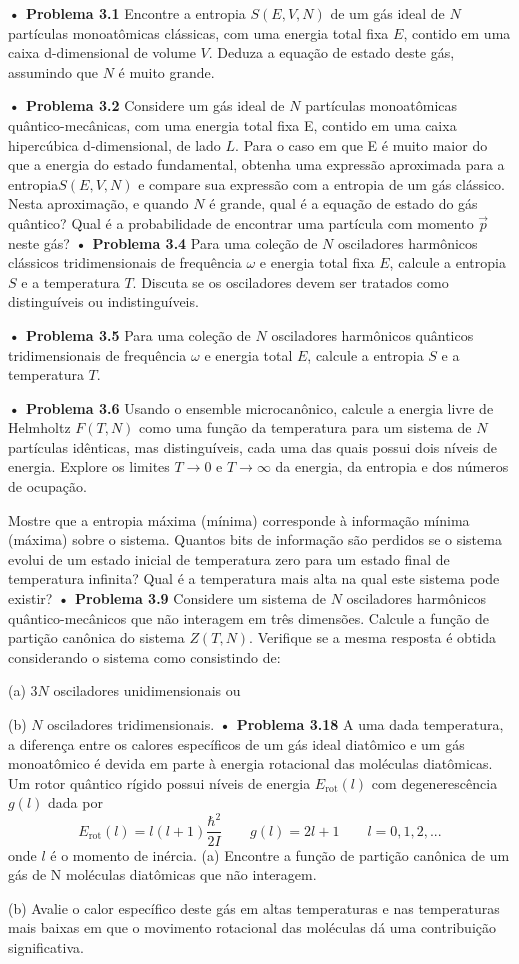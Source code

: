 \documentclass[12pt]{article}
\begin{document}
\textbf{• Problema 3.1} Encontre a entropia $S(E, V, N)$ de um gás ideal de $N$ partículas monoatômicas clássicas, com uma energia total fixa $E$, contido em uma caixa d-dimensional de volume $V$. Deduza a equação de estado deste gás, assumindo que $N$ é muito grande.

\textbf{• Problema 3.2} Considere um gás ideal de $N$ partículas monoatômicas quântico-mecânicas, com uma energia total fixa E, contido em uma caixa hipercúbica d-dimensional, de lado $L$. Para o caso em que E é muito maior do que a energia do estado fundamental, obtenha uma expressão aproximada para a entropia$ S(E, V, N)$ e compare sua expressão com a entropia de um gás clássico. Nesta aproximação, e quando $N$ é grande, qual é a equação de estado do gás quântico? Qual é a probabilidade de encontrar uma partícula com momento $\vec{p}$ neste gás?
\textbf{• Problema 3.4} Para uma coleção de $N$ osciladores harmônicos clássicos tridimensionais de frequência $\omega$ e energia total fixa $E$, calcule a entropia $S$ e a temperatura $T$. Discuta se os osciladores devem ser tratados como distinguíveis ou indistinguíveis.

\textbf{• Problema 3.5} Para uma coleção de $N$ osciladores harmônicos quânticos tridimensionais de frequência $\omega$ e energia total $E$, calcule a entropia $S$ e a temperatura $T$.

\textbf{• Problema 3.6} Usando o ensemble microcanônico, calcule a energia livre de Helmholtz $F(T, N)$ como uma função da temperatura para um sistema de $N$ partículas idênticas, mas distinguíveis, cada uma das quais possui dois níveis de energia. Explore os limites $T \rightarrow 0$ e $T \rightarrow \infty$ da energia, da entropia e dos números de ocupação.

Mostre que a entropia máxima (mínima) corresponde à informação mínima (máxima) sobre o sistema. Quantos bits de informação são perdidos se o sistema evolui de um estado inicial de temperatura zero para um estado final de temperatura infinita? Qual é a temperatura mais alta na qual este sistema pode existir?
\textbf{• Problema 3.9} Considere um sistema de $N$ osciladores harmônicos quântico-mecânicos que não interagem em três dimensões. Calcule a função de partição canônica do sistema $Z(T, N)$. Verifique se a mesma resposta é obtida considerando o sistema como consistindo de:

(a) $3N$ osciladores unidimensionais ou

(b) $N$ osciladores tridimensionais.
\textbf{• Problema 3.18} A uma dada temperatura, a diferença entre os calores específicos de um gás ideal diatômico e um gás monoatômico é devida em parte à energia rotacional das moléculas diatômicas. Um rotor quântico rígido possui níveis de energia $E_\text{rot}(l)$ com degenerescência $g(l)$ dada por 
\[
E_{\text{rot}}(l) = l(l+1) \frac{\hbar^2}{2I} \qquad g(l) = 2l + 1 \qquad l = 0, 1, 2, ...
\]
 onde $l$ é o momento de inércia.
(a) Encontre a função de partição canônica de um gás de N moléculas diatômicas que não interagem.

(b) Avalie o calor específico deste gás em altas temperaturas e nas temperaturas mais baixas em que o movimento rotacional das moléculas dá uma contribuição significativa.

 
 

 
\end{document}
